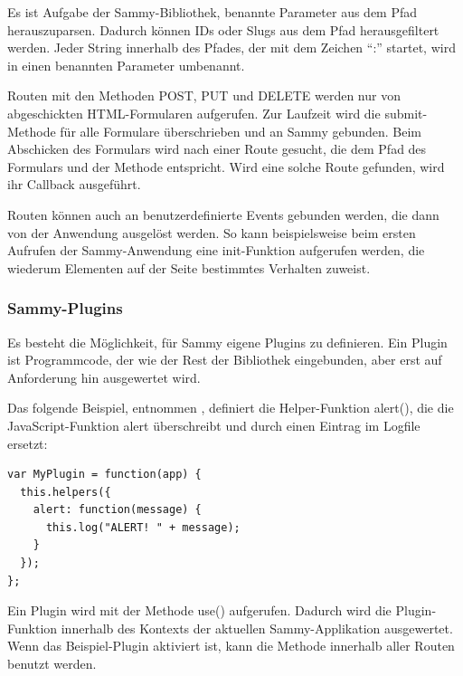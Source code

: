 Es ist Aufgabe der Sammy-Bibliothek, benannte Parameter aus dem Pfad herauszuparsen. Dadurch können IDs oder Slugs aus dem Pfad herausgefiltert werden. Jeder String innerhalb des Pfades, der mit dem Zeichen \enquote{:} startet, wird in einen benannten Parameter umbenannt. 

Routen mit den Methoden {\selectfont POST}, {\selectfont PUT} und {\selectfont DELETE} werden nur von abgeschickten HTML-Formularen aufgerufen. Zur Laufzeit wird die  {\selectfont submit}-Methode für alle Formulare überschrieben und an Sammy gebunden. Beim Abschicken des Formulars wird nach einer Route gesucht, die dem Pfad des Formulars und der Methode  entspricht. Wird eine solche Route gefunden, wird ihr Callback ausgeführt.

Routen können auch an benutzerdefinierte Events gebunden werden, die dann von der Anwendung ausgelöst werden. So kann beispielsweise beim ersten Aufrufen der Sammy-Anwendung eine {\selectfont init}-Funktion aufgerufen werden, die wiederum Elementen auf der Seite bestimmtes Verhalten zuweist. 


\subsubsection{Sammy-Plugins}

Es besteht die Möglichkeit, für Sammy eigene Plugins zu definieren. Ein Plugin ist Programmcode, der wie der Rest der Bibliothek eingebunden, aber erst auf Anforderung hin ausgewertet wird. 

Das folgende Beispiel, entnommen \cite{sammy:plugins}, definiert die Helper-Funktion {\selectfont alert()}, die die JavaScript-Funktion {\selectfont alert} überschreibt und durch einen Eintrag im Logfile ersetzt:

\medskip
\begin{lstlisting}[caption=Sammy.js: Beispiel f\"ur ein Plugin]
var MyPlugin = function(app) {
  this.helpers({
    alert: function(message) {
      this.log("ALERT! " + message);
    }
  });
};
\end{lstlisting}

Ein Plugin wird mit der Methode {\selectfont use()} aufgerufen. Dadurch wird die Plugin-Funktion innerhalb des Kontexts der aktuellen Sammy-Applikation ausgewertet. Wenn das Beispiel-Plugin aktiviert ist, kann die Methode innerhalb aller Routen benutzt werden. 

